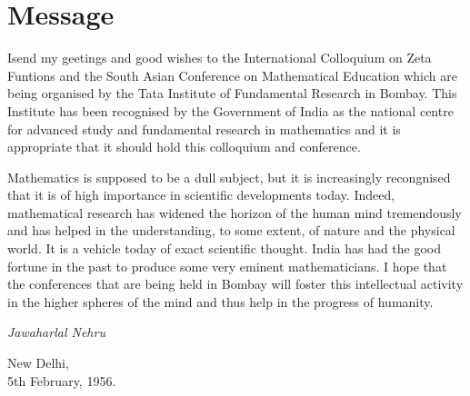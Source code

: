 \chapter{Message}

\setcounter{pageoriginal}{20}
I\pageoriginale send my geetings and good wishes to the International Colloquium on Zeta Funtions and the South Asian Conference on Mathematical Education which are being organised by the Tata Institute of Fundamental Research in Bombay. This Institute has been recognised by the Government of India as the national centre for advanced study and fundamental research in mathematics and it is appropriate that it should hold this colloquium and conference.

Mathematics is supposed to be a dull subject, but it is increasingly recongnised that it is of high importance in scientific developments today. Indeed, mathematical research has widened the horizon of the human mind tremendously and has helped in the understanding, to some extent, of nature and the physical world. It is a vehicle today of exact scientific thought. India has had the good fortune in the past to produce some very eminent mathematicians. I hope that the conferences that are being held in Bombay will foster this intellectual activity in the higher spheres of the mind and thus help in the progress of humanity.

\bigskip
\hfill {\em Jawaharlal Nehru}

\noindent
New Delhi,\\
5th February, 1956.
